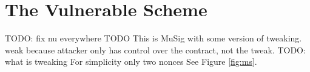 \documentclass[a4paper,orivec,oribibl,english]{llncs}
\begin{document}
\section{The Vulnerable Scheme}
TODO: fix nu everywhere
TODO
This is MuSig with some version of tweaking.
weak because attacker only has control over the contract, not the tweak.
TODO: what is tweaking
For simplicity only two nonces
See Figure \ref{fig:ms}.
\begin{figure}
 \begin{tcolorbox}[boxsep=-1mm]
  \begin{pchstack}[center]
   \begin{pcvstack}
    \pcvspace
    \pcvspace
    \pcvspace
    \pcvspace
    \pcvspace
\end{pcvstack}
\end{pchstack}
\end{tcolorbox}
\end{figure}
\end{document}
